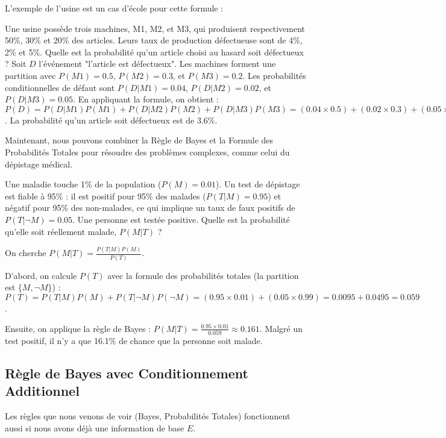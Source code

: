 L'exemple de l'usine est un cas d'école pour cette formule :

\begin{examplebox}
Une usine possède trois machines, M1, M2, et M3, qui produisent respectivement 50\%, 30\% et 20\% des articles. Leurs taux de production défectueuse sont de 4\%, 2\% et 5\%. Quelle est la probabilité qu'un article choisi au hasard soit défectueux ?
Soit $D$ l'événement "l'article est défectueux". Les machines forment une partition avec $P(M1)=0.5$, $P(M2)=0.3$, et $P(M3)=0.2$. Les probabilités conditionnelles de défaut sont $P(D|M1)=0.04$, $P(D|M2)=0.02$, et $P(D|M3)=0.05$.
En appliquant la formule, on obtient :
$P(D) = P(D|M1)P(M1) + P(D|M2)P(M2) + P(D|M3)P(M3) = (0.04 \times 0.5) + (0.02 \times 0.3) + (0.05 \times 0.2) = 0.02 + 0.006 + 0.01 = 0.036$.
La probabilité qu'un article soit défectueux est de 3.6\%.
\end{examplebox}

Maintenant, nous pouvons combiner la Règle de Bayes et la Formule des Probabilités Totales pour résoudre des problèmes complexes, comme celui du dépistage médical.

\begin{examplebox}
Une maladie touche 1\% de la population ($P(M) = 0.01$). Un test de dépistage est fiable à 95\% : il est positif pour 95\% des malades ($P(T|M)=0.95$) et négatif pour 95\% des non-malades, ce qui implique un taux de faux positifs de $P(T|\neg M) = 0.05$.
Une personne est testée positive. Quelle est la probabilité qu'elle soit réellement malade, $P(M|T)$ ?

On cherche $P(M|T) = \frac{P(T|M)P(M)}{P(T)}$.

D'abord, on calcule $P(T)$ avec la formule des probabilités totales (la partition est $\{M, \neg M\}$) :
$P(T) = P(T|M)P(M) + P(T|\neg M)P(\neg M) = (0.95 \times 0.01) + (0.05 \times 0.99) = 0.0095 + 0.0495 = 0.059$.

Ensuite, on applique la règle de Bayes : $P(M|T) = \frac{0.95 \times 0.01}{0.059} \approx 0.161$.
Malgré un test positif, il n'y a que 16.1\% de chance que la personne soit malade.
\end{examplebox}

\subsection{Règle de Bayes avec Conditionnement Additionnel}

Les règles que nous venons de voir (Bayes, Probabilités Totales) fonctionnent aussi si nous avons déjà une information de base $E$.

